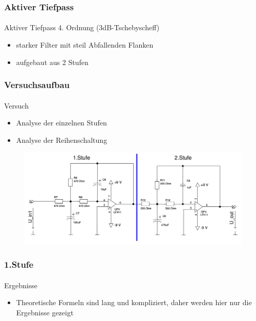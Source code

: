 \begin{frame}
\frametitle{Aktiver Tiefpass}
\framesubtitle{}
    \begin{block}{Aktiver Tiefpass 4. Ordnung (3dB-Tschebyscheff)}
         \begin{itemize}
             \item starker Filter mit steil Abfallenden Flanken
             \item aufgebaut aus 2 Stufen
         \end{itemize}
    \end{block}
\end{frame}
\begin{frame}
\frametitle{Versuchsaufbau}
\framesubtitle{}
    \begin{block}{Versuch}
        \begin{itemize}
            \item Analyse der einzelnen Stufen
            \item Analyse der Reihenschaltung
        \end{itemize}    
    \end{block}
    \begin{figure}[H]
    \begin{center}
            \includegraphics[scale=0.2]{./img/schaltung/tiefpass.png}
    \end{center}
    \end{figure}
\end{frame}
\begin{frame}
\frametitle{1.Stufe}
\framesubtitle{}
\begin{block}{Ergebnisse}
    \begin{itemize}
        \item Theoretische Formeln sind lang und kompliziert, daher werden hier
        nur die Ergebnisse gezeigt
    \end{itemize}
\end{block}
\end{frame}
